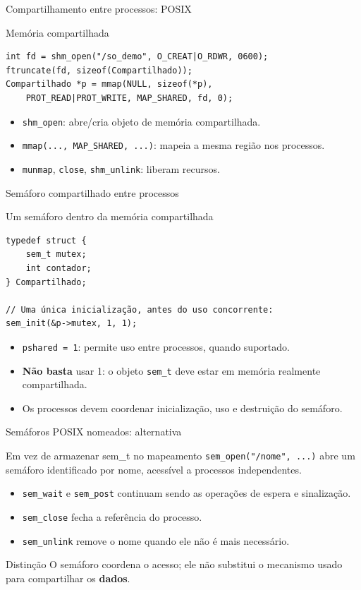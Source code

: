 \documentclass[aspectratio=169,11pt]{beamer}
\begin{document}
\begin{frame}[fragile]{Compartilhamento entre processos: POSIX}
\small
\begin{block}{Memória compartilhada}
\begin{verbatim}
int fd = shm_open("/so_demo", O_CREAT|O_RDWR, 0600);
ftruncate(fd, sizeof(Compartilhado));
Compartilhado *p = mmap(NULL, sizeof(*p),
    PROT_READ|PROT_WRITE, MAP_SHARED, fd, 0);
\end{verbatim}
\end{block}
\begin{itemize}
\item \texttt{shm\_open}: abre/cria objeto de memória compartilhada.
\item \texttt{mmap(..., MAP\_SHARED, ...)}: mapeia a mesma região nos processos.
\item \texttt{munmap}, \texttt{close}, \texttt{shm\_unlink}: liberam recursos.
\end{itemize}
\end{frame}

\begin{frame}[fragile]{Semáforo compartilhado entre processos}
\small
\begin{block}{Um semáforo dentro da memória compartilhada}
\begin{verbatim}
typedef struct {
    sem_t mutex;
    int contador;
} Compartilhado;

// Uma única inicialização, antes do uso concorrente:
sem_init(&p->mutex, 1, 1);
\end{verbatim}
\end{block}
\begin{itemize}
\item \texttt{pshared = 1}: permite uso entre processos, quando suportado.
\item \textbf{Não basta} usar 1: o objeto \texttt{sem\_t} deve estar em memória realmente compartilhada.
\item Os processos devem coordenar inicialização, uso e destruição do semáforo.
\end{itemize}
\end{frame}

\begin{frame}{Semáforos POSIX nomeados: alternativa}
\small
\begin{block}{Em vez de armazenar sem\_t no mapeamento}
\texttt{sem\_open("/nome", ...)} abre um semáforo identificado por nome, acessível a processos independentes.
\end{block}
\begin{itemize}
\item \texttt{sem\_wait} e \texttt{sem\_post} continuam sendo as operações de espera e sinalização.
\item \texttt{sem\_close} fecha a referência do processo.
\item \texttt{sem\_unlink} remove o nome quando ele não é mais necessário.
\end{itemize}
\begin{alertblock}{Distinção}
O semáforo coordena o acesso; ele não substitui o mecanismo usado para compartilhar os \textbf{dados}.
\end{alertblock}
\end{frame}
\end{document}
